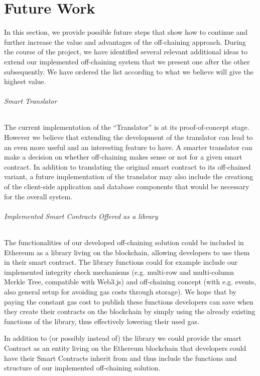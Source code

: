 \chapter{Future Work} \label{sec:future_work}

In this section, we provide possible future steps that show how to continue and further increase the value and advantages of the off-chaining approach. During the course of the project, we have identified several relevant additional ideas to extend our implemented off-chaining system that we present one after the other subsequently. We have ordered the list according to what we believe will give the highest value.

\subparagraph{Smart Translator}
The current implementation of the “Translator” is at its proof-of-concept stage. However we believe that extending the development of the translator can lead to an even more useful and an interesting feature to have. A smarter translator can make a decision on whether off-chaining makes sense or not for a given smart contract. In addition to translating the original smart contract to its off-chained variant, a future implementation of the translator may also include the creationg of the client-side application and database components that would be necessary for the overall system.

\subparagraph{Implemented Smart Contracts Offered as a library}
The functionalities of our developed off-chaining solution could be included in Ethereum as a library living on the blockchain, allowing developers to use them in their smart contract. The library functions could for example include our implemented integrity check mechanisms (e.g. multi-row and multi-column Merkle Tree, compatible with Web3.js) and off-chaining concept (with e.g. events, also general setup for avoiding gas costs through storage). We hope that by paying the constant gas cost to publish these functions developers can save when they create their contracts on the blockchain by simply using the already existing functions of the library, thus effectively lowering their used gas.

In addition to (or possibly instead of) the library we could provide the smart Contract as an entity living on the Ethereum blockchain that developers could have their Smart Contracts inherit from and thus include the functions and structure of our implemented off-chaining solution.


